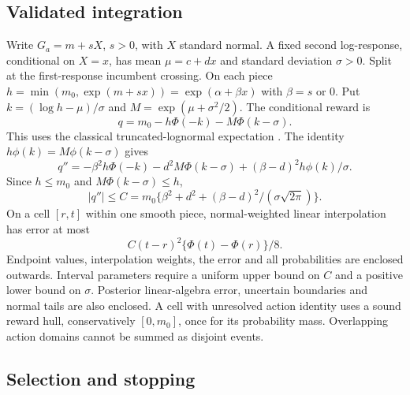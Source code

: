 

\subsection{Validated integration}

Write $G_a=m+sX$, $s>0$, with $X$ standard normal. A fixed second log-response, conditional on $X=x$, has mean $\mu=c+dx$ and standard deviation $\sigma>0$. Split at the first-response incumbent crossing. On each piece $h=\min(m_0,\exp(m+sx))=\exp(\alpha+\beta x)$ with $\beta=s$ or $0$. Put $k=(\log h-\mu)/\sigma$ and $M=\exp(\mu+\sigma^2/2)$. The conditional reward is
\begin{equation}
q=m_0-h\Phi(-k)-M\Phi(k-\sigma).                  \label{eq:positive_conditional}
\end{equation}
This uses the classical truncated-lognormal expectation \citep{ref45}. The identity $h\phi(k)=M\phi(k-\sigma)$ gives
\begin{equation}
q''=-\beta^2h\Phi(-k)-d^2M\Phi(k-\sigma)
            +(\beta-d)^2h\phi(k)/\sigma.          \label{eq:positive_curvature}
\end{equation}
Since $h\le m_0$ and $M\Phi(k-\sigma)\le h$,
\begin{equation}
|q''|\le C=m_0\{\beta^2+d^2+
                  (\beta-d)^2/(\sigma\sqrt{2\pi})\}.
                                                       \label{eq:positive_curvature_bound}
\end{equation}
On a cell $[r,t]$ within one smooth piece, normal-weighted linear interpolation has error at most
\begin{equation}
C(t-r)^2\{\Phi(t)-\Phi(r)\}/8.                    \label{eq:positive_cell_error}
\end{equation}
Endpoint values, interpolation weights, the error and all probabilities are enclosed outwards. Interval parameters require a uniform upper bound on $C$ and a positive lower bound on $\sigma$. Posterior linear-algebra error, uncertain boundaries and normal tails are also enclosed. A cell with unresolved action identity uses a sound reward hull, conservatively $[0,m_0]$, once for its probability mass. Overlapping action domains cannot be summed as disjoint events.

\subsection{Selection and stopping}

